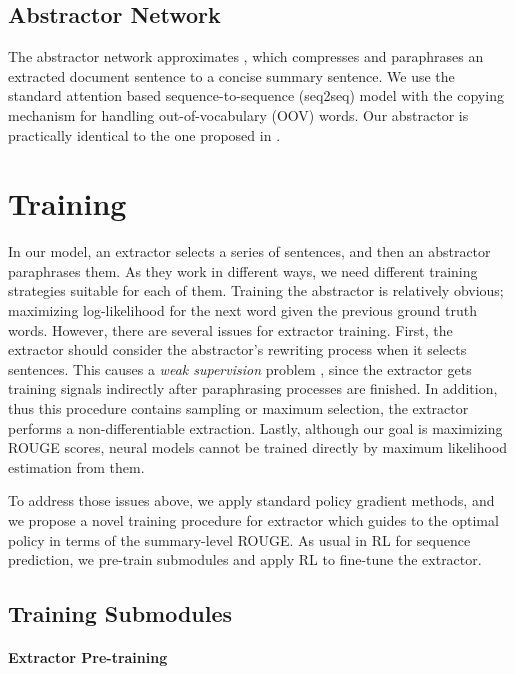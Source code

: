 \documentclass[11pt,a4paper]{article}
\begin{document}
\subsection{Abstractor Network}
The abstractor network approximates , which compresses
and paraphrases an extracted document sentence to a concise
summary sentence. We use the standard attention based
sequence-to-sequence (seq2seq) model \cite{BahdanauCB14, luong-etal-2015-effective}
with the copying mechanism \cite{see-etal-2017-get}
for handling out-of-vocabulary (OOV) words.
Our abstractor is practically identical to the one
proposed in \citet{chen-bansal-2018-fast}.

\section{Training} \label{Training}

In our model, an extractor selects a series of sentences, and then an abstractor paraphrases them. As they work in different ways,
we need different training strategies suitable for each of them. Training the abstractor
is relatively obvious; maximizing log-likelihood for the next word
given the previous ground truth words. However, there are several
issues for extractor training. First, the extractor should consider
the abstractor's rewriting process when it selects sentences.
This causes a \emph{weak supervision} problem \cite{jehl-etal-2019-neural},
since the extractor gets training signals indirectly
after paraphrasing processes are finished.
In addition, thus this procedure contains sampling or maximum selection,
the extractor performs a non-differentiable extraction.
Lastly, although our goal is maximizing ROUGE scores,
neural models cannot be trained directly by maximum likelihood estimation from them.

To address those issues above, we apply standard policy gradient methods,
and we propose a novel training procedure for extractor
which guides to the optimal policy in terms of the summary-level ROUGE. As usual in RL for sequence prediction,
we pre-train submodules and apply RL to fine-tune the extractor.

\subsection{Training Submodules}
\label{sec:submodule}

\paragraph{Extractor Pre-training}
\end{document}
